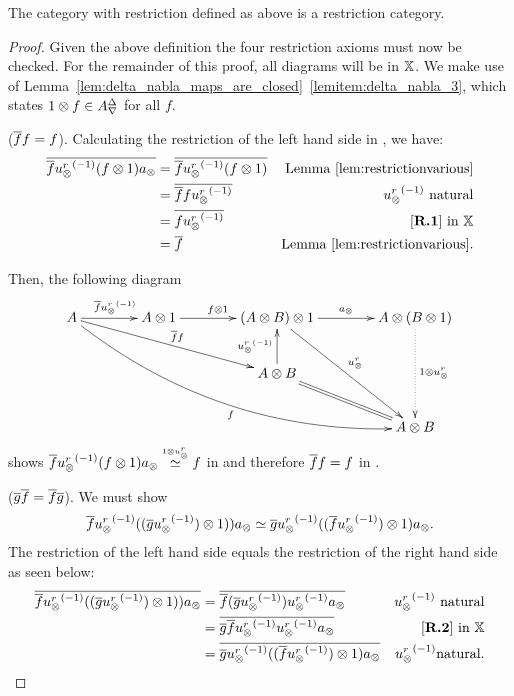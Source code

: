 \begin{lemma}\label{lem:xt_is_a_restriction_category}
  The category \Xt with restriction defined as above is a restriction category.
\end{lemma}
\begin{proof}
  Given the above definition the four restriction axioms must now be checked. For the remainder of
  this proof, all diagrams will be in $\mathbb{X}$. We make use of
  Lemma~\ref{lem:delta_nabla_maps_are_closed}~\ref{lemitem:delta_nabla_3},  which states $1\otimes f \in
  {A}^{\Delta}_{\nabla}$ for all $f$.

  \rone ($\overline{f} f = f$). Calculating the restriction of the left hand side in
      \X, we have:
      \begin{align*}
        \restr{\rst{f}\inv{\usr} (f\*1) a_{\*}} & = \restr{\rst{f}\inv{\usr} (f\*1)}
          & \text{Lemma \ref{lem:restrictionvarious}}\\
        & = \restr{\rst{f}f \inv{\usr}}  & \inv{\usr} \text{ natural}\\
        & = \restr{f \inv{\usr}}  & \text{ \rone in }\X\\
        & = \restr{f } & \text{Lemma \ref{lem:restrictionvarious}}.
      \end{align*}

      Then, the following diagram
      \[
        \xymatrix @C=40pt @R=25pt{
          A \ar[r]^{\restr{f} \inv{\usr}}
          \ar @/_25pt/[ddrrr]_f  \ar[drr]^{\restr{f}f}
          &A \* 1 \ar[r]^{f\* 1}
          &(A \* B) \* 1 \ar[r]^{a_{\*}} \ar[ddr]^{\usr}
          &A \* (B \* 1) \ar@{.>}[dd]^{1 \* {\usr}}\\
          &&A\*B \ar[u]^{\inv{\usr}} \ar@{=} [dr]\\
          && &A \* B
        }
      \]
      shows $\overline{f}{u_{\otimes}^r}^{(-1)} (f\otimes1) a_{\otimes} \overset{\scriptscriptstyle 1 \otimes {\ensuremath{u_{\otimes}^r}}}{\simeq} f$ in \X and therefore $\overline{f}f
      = f$ in \Xt.

     \rtwo ($\overline{g} \overline{f} = \overline{f} \overline{g}$). We must show
      \begin{equation}
        \overline{f}{u_{\otimes}^r}^{(-1)} ((\overline{g}{u_{\otimes}^r}^{(-1)})\otimes1)) a_{\otimes} \overset{\scriptscriptstyle }{\simeq}
        \overline{g}{u_{\otimes}^r}^{(-1)}((\overline{f}{u_{\otimes}^r}^{(-1)})\otimes1) a_{\otimes}.
        \label{eq:rtwo_in_xt}
      \end{equation}
      The restriction of the left hand
      side equals the restriction of the right hand side as seen below:
      \begin{align*}
        \restr{\rst{f}\inv{\usr} ((\restr{g}\inv\usr)\*1)) a_{\*}}
        & = \restr{\rst{f}(\restr{g}\inv\usr)\inv{\usr} a_{\*}} & \inv{\usr}   \text{ natural}\\
        & = \restr{\rst{g}\restr{f}\inv\usr\inv{\usr} a_{\*}} &  \text{\rtwo in }\X\\
        & = \restr{\rst{g}\inv{\usr}((\restr{f}\inv\usr)\*1) a_{\*}} & \inv{\usr}   \text{natural}.
      \end{align*}


\end{proof}
